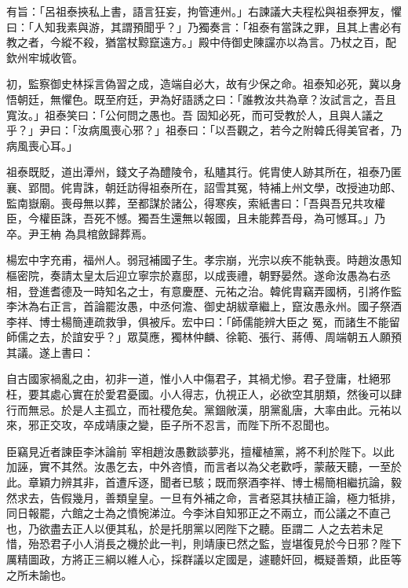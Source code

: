 \begin{pinyinscope}
 有旨：「呂祖泰挾私上書，語言狂妄，拘管連州。」右諫議大夫程松與祖泰狎友，懼曰：「人知我素與游，其謂預聞乎？」乃獨奏言：「祖泰有當誅之罪，且其上書必有教之者，今縱不殺，猶當杖黥竄遠方。」殿中侍御史陳讜亦以為言。乃杖之百，配欽州牢城收管。



 初，監察御史林採言偽習之成，造端自必大，故有少保之命。祖泰知必死，冀以身悟朝廷，無懼色。既至府廷，尹為好語誘之曰：「誰教汝共為章？汝試言之，吾且寬汝。」祖泰笑曰：「公何問之愚也。吾
 固知必死，而可受教於人，且與人議之乎？」尹曰：「汝病風喪心邪？」祖泰曰：「以吾觀之，若今之附韓氏得美官者，乃病風喪心耳。」



 祖泰既貶，道出潭州，錢文子為醴陵令，私贐其行。侂胄使人跡其所在，祖泰乃匿襄、郢間。侂胄誅，朝廷訪得祖泰所在，詔雪其冤，特補上州文學，改授迪功郎、監南嶽廟。喪母無以葬，至都謀於諸公，得寒疾，索紙書曰：「吾與吾兄共攻權臣，今權臣誅，吾死不憾。獨吾生還無以報國，且未能葬吾母，為可憾耳。」乃卒。尹王柟
 為具棺斂歸葬焉。



 楊宏中字充甫，福州人。弱冠補國子生。孝宗崩，光宗以疾不能執喪。時趙汝愚知樞密院，奏請太皇太后迎立寧宗於嘉邸，以成喪禮，朝野晏然。遂命汝愚為右丞相，登進耆德及一時知名之士，有意慶歷、元祐之治。韓侂胄竊弄國柄，引將作監李沐為右正言，首論罷汝愚，中丞何澹、御史胡紱章繼上，竄汝愚永州。國子祭酒李祥、博士楊簡連疏救爭，俱被斥。宏中曰：「師儒能辨大臣之
 冤，而諸生不能留師儒之去，於誼安乎？」眾莫應，獨林仲麟、徐範、張行、蔣傅、周端朝五人願預其議。遂上書曰：



 自古國家禍亂之由，初非一道，惟小人中傷君子，其禍尤慘。君子登庸，杜絕邪枉，要其處心實在於愛君憂國。小人得志，仇視正人，必欲空其朋類，然後可以肆行而無忌。於是人主孤立，而社稷危矣。黨錮敞漢，朋黨亂唐，大率由此。元祐以來，邪正交攻，卒成靖康之變，臣子所不忍言，而陛下所不忍聞也。



 臣竊見近者諫臣李沐論前
 宰相趙汝愚數談夢兆，擅權植黨，將不利於陛下。以此加誣，實不其然。汝愚乞去，中外咨憤，而言者以為父老歡呼，蒙蔽天聽，一至於此。章穎力辨其非，首遭斥逐，聞者已駭；既而祭酒李祥、博士楊簡相繼抗論，毅然求去，告假幾月，善類皇皇。一旦有外補之命，言者惡其扶植正論，極力牴排，同日報罷，六館之士為之憤惋涕泣。今李沐自知邪正之不兩立，而公議之不直己也，乃欲盡去正人以便其私，於是托朋黨以罔陛下之聽。臣謂二
 人之去若未足惜，殆恐君子小人消長之機於此一判，則靖康已然之監，豈堪復見於今日邪？陛下厲精圖政，方將正三綱以維人心，採群議以定國是，遽聽奸回，概疑善類，此臣等之所未諭也。




\end{pinyinscope}

